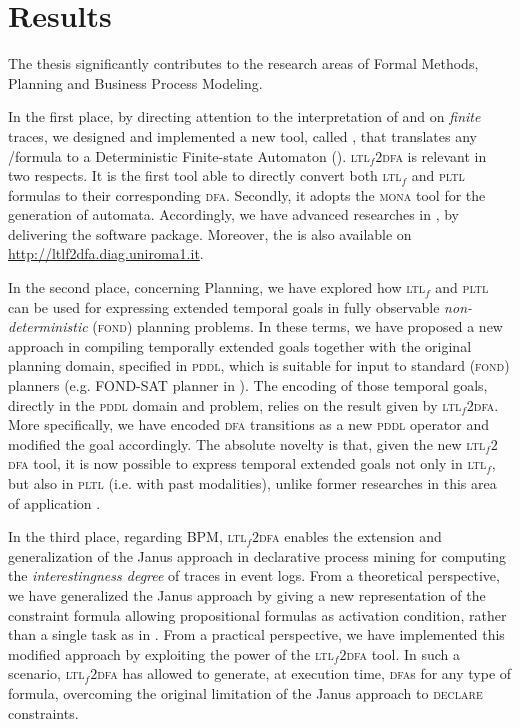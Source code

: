 \section{Results}
The thesis significantly contributes to the research areas of Formal Methods, Planning and Business Process Modeling. 

In the first place, by directing attention to the interpretation of \LTL and \PLTL on \textit{finite} traces, we designed and implemented a new tool, called \LTLfToDFA, that translates any \LTLf/\PLTL formula to a Deterministic Finite-state Automaton (\DFA). \textsc{ltl}$_f2$\textsc{dfa} is relevant in two respects. It is the first tool able to directly convert both \textsc{ltl}$_f$ and \textsc{pltl} formulas to their corresponding \textsc{dfa}. Secondly, it adopts the \textsc{mona} tool for the generation of automata. Accordingly, we have advanced researches in \cite{zhu2017symbolic,zpv2018}, by delivering the \LTLfToDFA software package. Moreover, the \LTLfToDFA is also available on \href{http://ltlf2dfa.diag.uniroma1.it}{http://ltlf2dfa.diag.uniroma1.it}.

In the second place, concerning Planning, we have explored how \textsc{ltl}$_f$ and \textsc{pltl} can be used for expressing extended temporal goals in fully observable \textit{non-deterministic} (\textsc{fond}) planning problems. In these terms, we have proposed a new approach in compiling temporally extended goals together with the original planning domain, specified in \textsc{pddl}, which is suitable for input to standard (\textsc{fond}) planners (e.g. FOND-SAT planner in \cite{geffner2018compact}).
The encoding of those temporal goals, directly in the \textsc{pddl} domain and problem, relies on the result given by \textsc{ltl}$_f2$\textsc{dfa}. More specifically, we have encoded \textsc{dfa} transitions as a new \textsc{pddl} operator and modified the goal accordingly. The absolute novelty is that, given the new \textsc{ltl}$_f2$\textsc{dfa} tool, it is now possible to express temporal extended goals not only in \textsc{ltl}$_f$, but also in \textsc{pltl} (i.e. with past modalities), unlike  former researches in this area of application \citep{camacho2017non, camacho2018finite, camacho2018ltl}.

In the third place, regarding \textsc{BPM}, \textsc{ltl}$_f2$\textsc{dfa} enables the extension and generalization of the Janus approach in declarative process mining for computing the \textit{interestingness degree} of traces in event logs. From a theoretical perspective, we have generalized the Janus approach by giving a new representation of the constraint formula allowing propositional formulas as activation condition, rather than a single task as in \cite{cecconi2018interestingness}. From a practical perspective, we have implemented this modified approach by exploiting the power of the \textsc{ltl}$_f2$\textsc{dfa} tool. In such a scenario, \textsc{ltl}$_f2$\textsc{dfa} has allowed to generate, at execution time, \textsc{dfa}s for any type of formula, overcoming the original limitation of the Janus approach to \textsc{declare} constraints.
